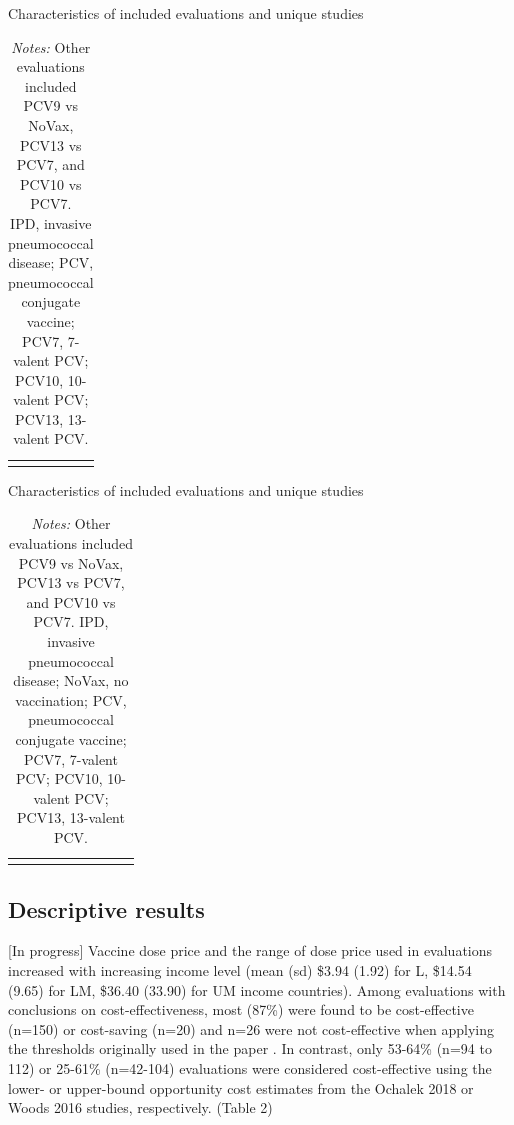 \documentclass[12pt]{article}
\begin{document}
\begin{table}[H]
    \centering \singlespacing \small
    \caption{Characteristics of included evaluations and unique studies}
    \begin{tabular}{|L{6cm}|C{4.5cm}|C{4cm}|}
        \hline
    \end{tabular}
    \label{tab_evals_studies}
    \caption*{\footnotesize \textit{Notes:} Other evaluations included PCV9 vs NoVax, PCV13 vs PCV7, and PCV10 vs PCV7. \\
    IPD, invasive pneumococcal disease; PCV, pneumococcal conjugate vaccine; PCV7, 7-valent PCV; PCV10, 10-valent PCV; PCV13, 13-valent PCV. 
}
\end{table}


\begin{table}[H]
    \centering \singlespacing \small
    \caption{Characteristics of included evaluations and unique studies}
    \begin{tabular}{|L{2.8cm}|C{1.8cm}|C{1.3cm}|C{1cm}|C{1cm}|C{1cm}|C{1cm}|C{1cm}|C{1cm}|}
        \hline
    \end{tabular}
    \label{tab_evals_thresholds}
    \caption*{\footnotesize \textit{Notes:} Other evaluations included PCV9 vs NoVax, PCV13 vs PCV7, and PCV10 vs PCV7. IPD, invasive pneumococcal disease; NoVax, no vaccination; PCV, pneumococcal conjugate vaccine; PCV7, 7-valent PCV; PCV10, 10-valent PCV; PCV13, 13-valent PCV. 
}
\end{table}

\subsection{Descriptive results}
[In progress]
Vaccine dose price and the range of dose price used in evaluations increased with increasing income level (mean (sd) \$3.94 (1.92) for L, \$14.54 (9.65) for LM, \$36.40 (33.90)  for UM income countries). 
Among evaluations with conclusions on cost-effectiveness, most (87\%) were found to be cost-effective (n=150) or cost-saving (n=20) and n=26 were not cost-effective when applying the thresholds originally used in the paper . In contrast, only 53-64\% (n=94 to 112) or 25-61\% (n=42-104) evaluations were considered cost-effective using the lower- or upper-bound opportunity cost estimates from the Ochalek 2018 or Woods 2016 studies, respectively. (Table 2)
\end{document}
